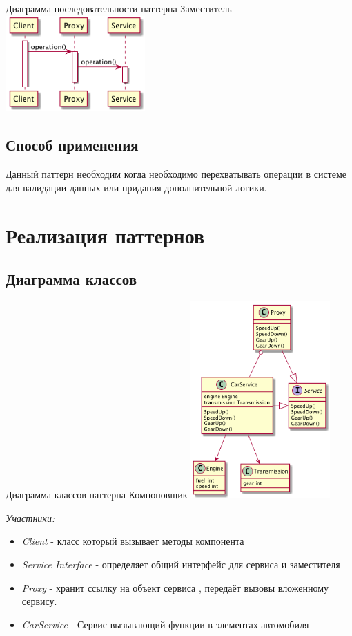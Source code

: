 \documentclass[PI,LAB]{HSEUniversity}
\begin{document}
 \begin{FIGURE}[h]{Диаграмма последовательности паттерна Заместитель\label{fig:example-figure}}
	\includegraphics[width=0.4\textwidth]{../out/diagrams/default/compactors}
\end{FIGURE}
    \section{Способ применения}
    Данный паттерн необходим когда необходимо перехватывать операции в системе для валидации данных или придания дополнительной логики.
    \chapter{Реализация паттернов}

    \section{Диаграмма классов}
     \begin{FIGURE}[h]{Диаграмма классов паттерна Компоновщик\label{fig:example-figure}}
    	\includegraphics[width=0.4\textwidth]{../out/diagrams/builder/compactor}
    \end{FIGURE}
	\emph{Участники:}
	\begin{itemize}
	
		\item \emph{Client} - класс который вызывает методы компонента
	\item \emph{Service Interface} - определяет общий интерфейс для сервиса и заместителя
	\item \emph{Proxy} -  хранит ссылку на объект сервиса ,  передаёт вызовы вложенному сервису.
	\item \emph{CarService} - Сервис вызывающий функции в элементах автомобиля
	\end{itemize}
\pagebreak
\end{document}
